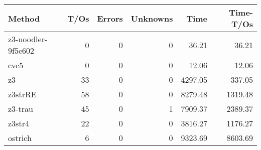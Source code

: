 \begin{tabular}{lrrrrr}
\hline
 Method             &   T/Os &   Errors &   Unknowns &    Time &   Time-T/Os \\
\hline
 z3-noodler-9f5e602 &      0 &        0 &          0 &   36.21 &       36.21 \\
 cvc5               &      0 &        0 &          0 &   12.06 &       12.06 \\
 z3                 &     33 &        0 &          0 & 4297.05 &      337.05 \\
 z3strRE            &     58 &        0 &          0 & 8279.48 &     1319.48 \\
 z3-trau            &     45 &        0 &          1 & 7909.37 &     2389.37 \\
 z3str4             &     22 &        0 &          0 & 3816.27 &     1176.27 \\
 ostrich            &      6 &        0 &          0 & 9323.69 &     8603.69 \\
\hline
\end{tabular}

